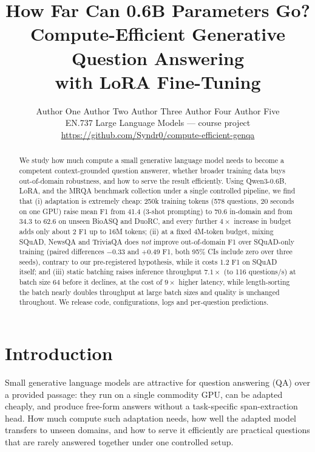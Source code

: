 \documentclass{article}
\title{How Far Can 0.6B Parameters Go?\\Compute-Efficient Generative Question Answering\\with LoRA Fine-Tuning}
\author{%
  Author One \And Author Two \And Author Three \And Author Four \And Author Five \\
  EN.737 Large Language Models --- course project \\
  \url{https://github.com/Syndr0/compute-efficient-genqa}
}
\begin{document}
\maketitle

\begin{abstract}
We study how much compute a small generative language model needs to become a competent
context-grounded question answerer, whether broader training data buys out-of-domain robustness,
and how to serve the result efficiently. Using Qwen3-0.6B, LoRA, and the MRQA benchmark collection
under a single controlled pipeline, we find that (i) adaptation is extremely cheap: 250k training
tokens (578 questions, 20 seconds on one GPU) raise mean F1 from 41.4 (3-shot prompting) to 70.6
in-domain and from 34.3 to 62.6 on unseen BioASQ and DuoRC, and every further $4\times$ increase in
budget adds only about 2 F1 up to 16M tokens; (ii) at a fixed 4M-token budget, mixing SQuAD, NewsQA
and TriviaQA does \emph{not} improve out-of-domain F1 over SQuAD-only training (paired differences
$-0.33$ and $+0.49$ F1, both 95\% CIs include zero over three seeds), contrary to our pre-registered
hypothesis, while it costs 1.2 F1 on SQuAD itself; and (iii) static batching raises inference throughput
$7.1\times$ (to 116 questions/s) at batch size 64 before it declines, at the cost of $9\times$ higher
latency, while length-sorting the batch nearly doubles throughput at large batch sizes and quality is
unchanged throughout. We release code, configurations, logs and per-question predictions.
\end{abstract}

\section{Introduction}
\label{sec:intro}

Small generative language models are attractive for question answering (QA) over a provided
passage: they run on a single commodity GPU, can be adapted cheaply, and produce free-form answers
without a task-specific span-extraction head. How much compute such adaptation needs, how well the
adapted model transfers to unseen domains, and how to serve it efficiently are practical questions
that are rarely answered together under one controlled setup.
\end{document}

